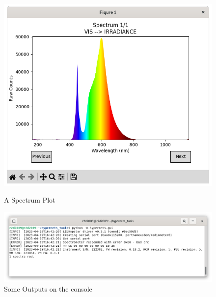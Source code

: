 \begin{figure}[!ht]
\begin{minipage}[b]{0.48\textwidth}
	  \includegraphics[width=\linewidth]{images/gui_spectrum.png}
	\vspace{-15pt}
	\caption{A Spectrum Plot}
	\label{fig:spectrumPlot}
  \end{minipage}
	\vspace{15pt}
	\vspace{15pt}
	\vspace{15pt}
  \begin{minipage}[b]{\textwidth}
	  \includegraphics[width=\linewidth]{images/gui_console.png}
	\vspace{-15pt}
	\caption{Some Outputs on the console}
	\label{fig:spectrumPlot}
  \end{minipage}
\end{figure}

\clearpage
\newpage
